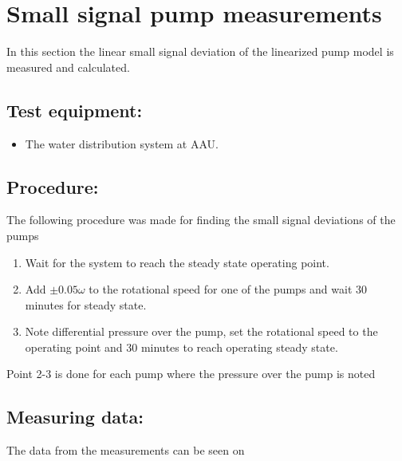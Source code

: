 \section{Small signal pump measurements}
\label{sec:small_sig_pump}

In this section the linear small signal deviation of the linearized pump model is measured and calculated.


\subsection*{Test equipment:}
\begin{itemize}
\item The water distribution system at AAU.
\end{itemize}

\subsection*{Procedure:}
The following procedure was made for finding the small signal deviations of the pumps
\begin{enumerate}
\item Wait for the system to reach the steady state operating point.
\item Add $\pm 0.05\omega$ to the rotational speed for one of the pumps and wait 30 minutes for steady state.
\item Note differential pressure over the pump, set the rotational speed to the operating point and 30 minutes to reach operating steady state. 
\end{enumerate}
Point 2-3 is done for each pump where the pressure over the pump is noted 

\subsection*{Measuring data:}
The data from the measurements can be seen on 


% 

